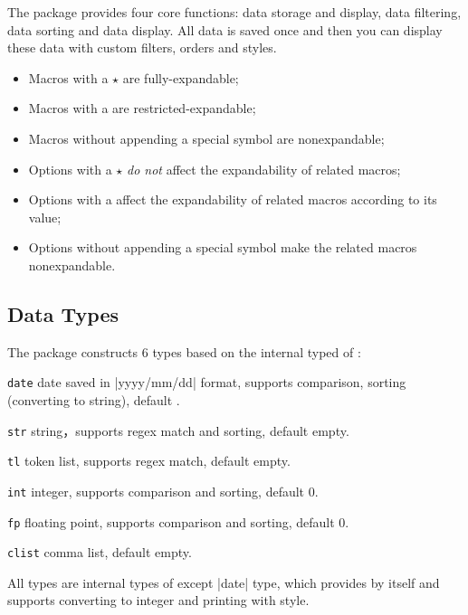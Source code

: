 \documentclass[full]{l3doc}
\begin{document}
\begin{documentation}
The package provides four core functions: data storage and display, data
filtering, data sorting and data display. All data is saved once and then you
can display these data with custom filters, orders and styles.

\begin{itemize}
  \item Macros with a $\star$ are fully-expandable;
  \item Macros with a  are restricted-expandable;
  \item Macros without appending a special symbol are nonexpandable;
  \item Options with a $\star$ \textit{do not} affect the expandability of
    related macros;
  \item Options with a  affect the expandability of related macros
    according to its value;
  \item Options without appending a special symbol make the related macros
    nonexpandable.
\end{itemize}

\subsection{Data Types}

The package constructs 6 types based on the internal typed of :
\begin{Description}
  \item[\texttt{date}]
    date saved in |yyyy/mm/dd| format, supports comparison, sorting
    (converting to string), default .
  \item[\texttt{str}]
    string，supports regex match and sorting, default empty.
  \item[\texttt{tl}]
    token list, supports regex match, default empty.
  \item[\texttt{int}]
    integer, supports comparison and sorting, default 0.
  \item[\texttt{fp}]
    floating point, supports comparison and sorting, default 0.
  \item[\texttt{clist}]
    comma list, default empty.
\end{Description}

All types are internal types of  except |date| type, which provides
by  itself and supports converting to integer and printing with
style.


\end{documentation}
\end{document}
